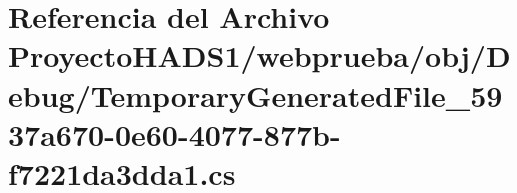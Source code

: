 \hypertarget{_proyecto_h_a_d_s1_2webprueba_2obj_2_debug_2_temporary_generated_file__5937a670-0e60-4077-877b-f7221da3dda1_8cs}{}\section{Referencia del Archivo Proyecto\+H\+A\+D\+S1/webprueba/obj/\+Debug/\+Temporary\+Generated\+File\+\_\+5937a670-\/0e60-\/4077-\/877b-\/f7221da3dda1.cs}
\label{_proyecto_h_a_d_s1_2webprueba_2obj_2_debug_2_temporary_generated_file__5937a670-0e60-4077-877b-f7221da3dda1_8cs}
